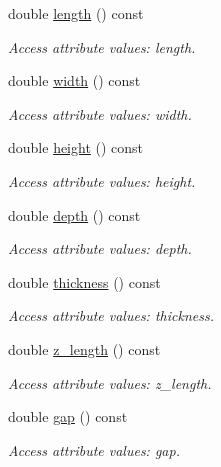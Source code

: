 \begin{DoxyCompactItemize}
double \hyperlink{struct_d_d4hep_1_1_x_m_l_1_1_dimension_a6646f1da82102f21239fc662810bad3b}{length} () const
\begin{DoxyCompactList}\small\item\em Access attribute values\+: length. \end{DoxyCompactList}\item 
double \hyperlink{struct_d_d4hep_1_1_x_m_l_1_1_dimension_ac897112473a04bb5dba07aa0e1c58e40}{width} () const
\begin{DoxyCompactList}\small\item\em Access attribute values\+: width. \end{DoxyCompactList}\item 
double \hyperlink{struct_d_d4hep_1_1_x_m_l_1_1_dimension_a6a8f064bc14b5d83fa07e927ae6e8c4d}{height} () const
\begin{DoxyCompactList}\small\item\em Access attribute values\+: height. \end{DoxyCompactList}\item 
double \hyperlink{struct_d_d4hep_1_1_x_m_l_1_1_dimension_a46b409212807ae5df6f3c1997614ccb4}{depth} () const
\begin{DoxyCompactList}\small\item\em Access attribute values\+: depth. \end{DoxyCompactList}\item 
double \hyperlink{struct_d_d4hep_1_1_x_m_l_1_1_dimension_a37a9d75490b44b904af4f7218186905f}{thickness} () const
\begin{DoxyCompactList}\small\item\em Access attribute values\+: thickness. \end{DoxyCompactList}\item 
double \hyperlink{struct_d_d4hep_1_1_x_m_l_1_1_dimension_a2f1a16817409d14fc203ad003933d805}{z\+\_\+length} () const
\begin{DoxyCompactList}\small\item\em Access attribute values\+: z\+\_\+length. \end{DoxyCompactList}\item 
double \hyperlink{struct_d_d4hep_1_1_x_m_l_1_1_dimension_a1b850f71f9fceb04c4df5cd9a754b96c}{gap} () const
\begin{DoxyCompactList}\small\item\em Access attribute values\+: gap. \end{DoxyCompactList}\item 

\end{DoxyCompactItemize}

